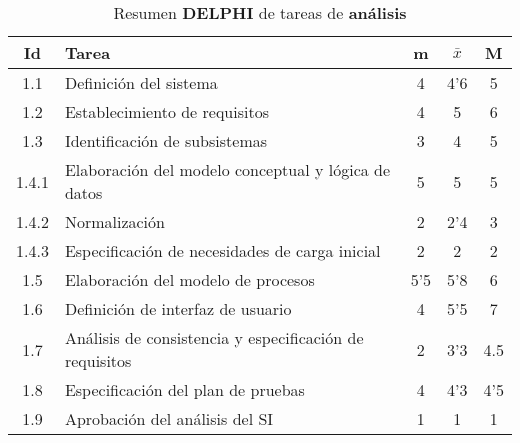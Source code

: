 \documentclass[11pt,a4paper,spanish,twoside]{report}
\begin{document}
\begin{table}[!h]
\centering
  \begin{tabular}{|c||p{8cm}||c|c|c|}
    \hline
    \textbf{Id} & \textbf{Tarea} & \textbf{m} & 
    \textbf{$\bar{x}$} &\textbf{M} \\
    \hline \hline
    1.1 & Definición del sistema & 4 & 4'6 & 5\\ 
    \hline
    1.2 & Establecimiento de requisitos & 4 & 5 & 6\\
    \hline
    1.3 & Identificación de subsistemas & 3 & 4 & 5\\
    \hline
    1.4.1 & Elaboración del modelo conceptual y lógica de datos & 5 & 5 & 5\\
    \hline
    1.4.2 & Normalización & 2 & 2'4 & 3 \\
    \hline
    1.4.3 & Especificación de necesidades de carga inicial & 2 & 2 & 2\\
    \hline
    1.5 & Elaboración del modelo de procesos & 5'5 & 5'8 & 6\\
    \hline
    1.6 & Definición de interfaz de usuario & 4 & 5'5 & 7\\
    \hline
    1.7 & Análisis de consistencia y especificación de requisitos & 2 & 3'3 &
    4.5\\
    \hline
    1.8 & Especificación del plan de pruebas & 4 & 4'3 & 4'5\\
    \hline
    1.9 & Aprobación del análisis del SI & 1 & 1 & 1\\
    \hline
  \end{tabular}
  \caption{Resumen \textbf{DELPHI} de tareas de \textbf{análisis}}
  \label{Tab:rDELPHIana}
\end{table}
\end{document}
